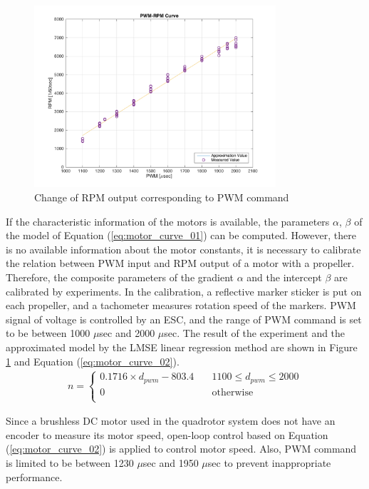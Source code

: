 \begin{figure}
    \centering
    \includegraphics[width=0.8\textwidth]{graphics/pwm_rpm_curve.png}
    \caption{Change of RPM output corresponding to PWM command}
    \label{fig:pwm_rpm}
\end{figure}
If the characteristic information of the motors is available, the parameters \(\alpha\), \(\beta\) of the model of Equation (\ref{eq:motor_curve_01}) can be computed. However, there is no available information about the motor constants, it is necessary to calibrate the relation between PWM input and RPM output of a motor with a propeller. Therefore, the composite parameters of the gradient \(\alpha\) and the intercept \(\beta\) are calibrated by experiments. In the calibration, a reflective marker sticker is put on each propeller, and a tachometer measures rotation speed of the markers. PWM signal of voltage is controlled by an ESC, and the range of PWM command is set to be between 1000 \(\mu\)sec and 2000 \(\mu\)sec. The result of the experiment and the approximated model by the LMSE linear regression method are shown in Figure \ref{fig:pwm_rpm} and Equation (\ref{eq:motor_curve_02}).\\
\begin{equation}
\label{eq:motor_curve_02}
\begin{aligned}
n = 
\begin{cases}
     0.1716 \times d_{pwm}  - 803.4 \quad &  1100 \le d_{pwm} \le 2000 \\
    0  \quad &   \text{otherwise} \\
  \end{cases}
  \end{aligned}
\end{equation}


Since a brushless DC motor used in the quadrotor system does not have an encoder to measure its motor speed, open-loop control based on Equation (\ref{eq:motor_curve_02}) is applied to control motor speed. Also, PWM command is limited to be between 1230 \(\mu\)sec and 1950 \(\mu\)sec to prevent inappropriate performance.

